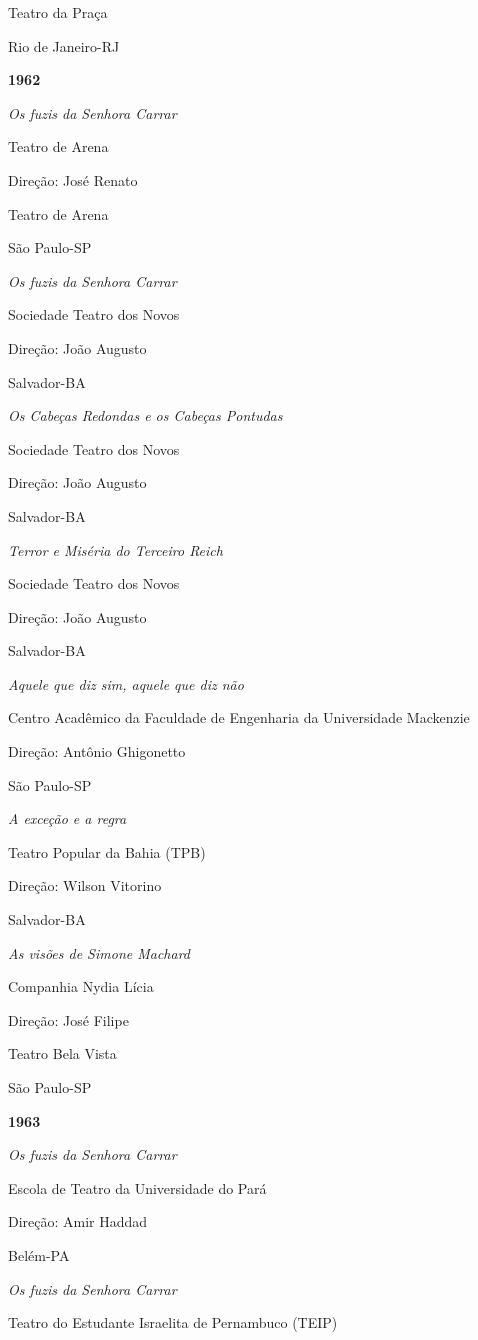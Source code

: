 Teatro da Praça

Rio de Janeiro-RJ

\textbf{1962}

\textit{Os fuzis da Senhora Carrar}

Teatro de Arena

Direção: José Renato

Teatro de Arena

São Paulo-SP

\textit{Os fuzis da Senhora Carrar}

Sociedade Teatro dos Novos

Direção: João Augusto

Salvador-BA

\textit{Os Cabeças Redondas e os Cabeças Pontudas}

Sociedade Teatro dos Novos

Direção: João Augusto

Salvador-BA

\textit{Terror e Miséria do Terceiro Reich}

Sociedade Teatro dos Novos

Direção: João Augusto

Salvador-BA

\textit{Aquele que diz sim, aquele que diz não}

Centro Acadêmico da Faculdade de Engenharia da Universidade Mackenzie

Direção: Antônio Ghigonetto

São Paulo-SP

\textit{A exceção e a regra}

Teatro Popular da Bahia (TPB)

Direção: Wilson Vitorino

Salvador-BA

\textit{As visões de Simone Machard}

Companhia Nydia Lícia

Direção: José Filipe

Teatro Bela Vista

São Paulo-SP

\textbf{1963}

\textit{Os fuzis da Senhora Carrar}

Escola de Teatro da Universidade do Pará

Direção: Amir Haddad

Belém-PA

\textit{Os fuzis da Senhora Carrar}

Teatro do Estudante Israelita de Pernambuco (TEIP)

